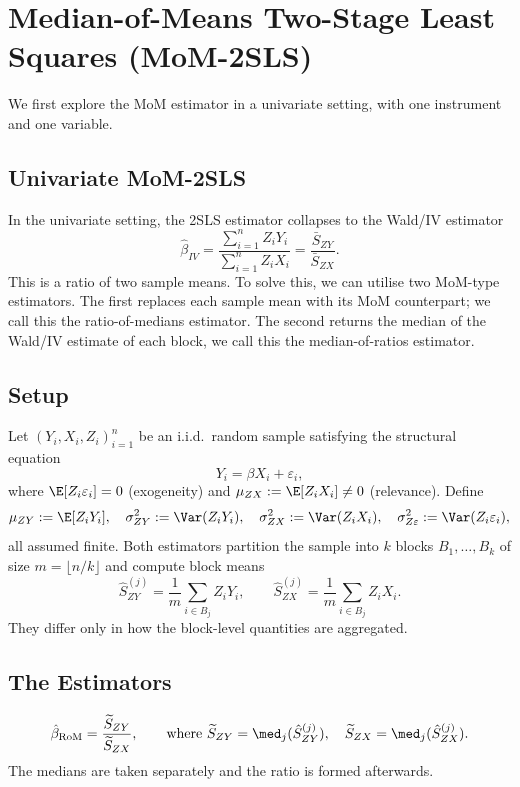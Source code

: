 
\section{Median-of-Means Two-Stage Least Squares (MoM-2SLS)}
We first explore the MoM estimator in a univariate setting, with one instrument and one variable.

\subsection{Univariate MoM-2SLS}

In the univariate setting, the 2SLS estimator collapses to the Wald/IV estimator
\[
\hat{\beta}_{IV}=\frac{\sum_{i=1}^{n}Z_iY_i}{\sum_{i=1}^{n}Z_iX_i} = \frac{\bar{S}_{ZY}}{\bar{S}_{ZX}}.
\]
This is a ratio of two sample means. To solve this, we can utilise two MoM-type estimators. The first replaces each sample mean with its MoM counterpart; we call this the ratio-of-medians estimator. The second returns the median of the Wald/IV estimate of each block, we call this the median-of-ratios estimator. 

\subsection{Setup}
Let $(Y_i, X_i, Z_i)_{i=1}^{n}$ be an i.i.d.\ random sample satisfying the structural equation 
\[
    Y_i = \beta X_i + \varepsilon_i,
\]
where $\E[Z_i\varepsilon_i] = 0$ (exogeneity) and $\mu_{ZX} := \E[Z_iX_i] \neq 0$ (relevance). Define
\[
    \mu_{ZY} := \E[Z_iY_i], \quad 
    \sigma_{ZY}^2 := \Var(Z_iY_i), \quad 
    \sigma_{ZX}^2 := \Var(Z_iX_i), \quad 
    \sigma_{Z\varepsilon}^2 := \Var(Z_i\varepsilon_i),
\]
all assumed finite. Both estimators partition the sample into $k$ blocks $B_1, \dots, B_k$ of size $m = \lfloor n/k \rfloor$ and compute block means 
\[
    \hat{S}_{ZY}^{(j)} = \frac{1}{m}\sum_{i \in B_j} Z_iY_i, \qquad \hat{S}_{ZX}^{(j)} = \frac{1}{m}\sum_{i \in B_j} Z_iX_i.
\]
They differ only in how the block-level quantities are aggregated.

\subsection{The Estimators}
 
\begin{definition}
\[
    \hat{\beta}_{\mathrm{RoM}} = \frac{\widetilde{S}_{ZY}}{\widetilde{S}_{ZX}}, \qquad \text{where } \widetilde{S}_{ZY} = \med_j(\hat{S}_{ZY}^{(j)}), \quad \widetilde{S}_{ZX} = \med_j(\hat{S}_{ZX}^{(j)}).
\]
The medians are taken separately and the ratio is formed afterwards.
\end{definition}
 
